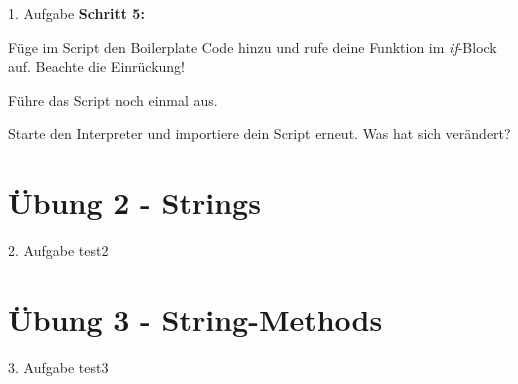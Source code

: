 \begin{frame}{1. Aufgabe}
	\textbf{Schritt 5:}
	
	Füge im Script den Boilerplate Code hinzu und rufe deine Funktion im \textit{if}-Block auf. Beachte die Einrückung!
	
	
	
	Führe das Script noch einmal aus.
	
	Starte den Interpreter und importiere dein Script erneut. Was hat sich verändert?
\end{frame}

\section{Übung 2 - Strings}

\begin{frame}{2. Aufgabe}
	test2
\end{frame}

\section{Übung 3 - String-Methods}

\begin{frame}{3. Aufgabe}
	test3
\end{frame}



